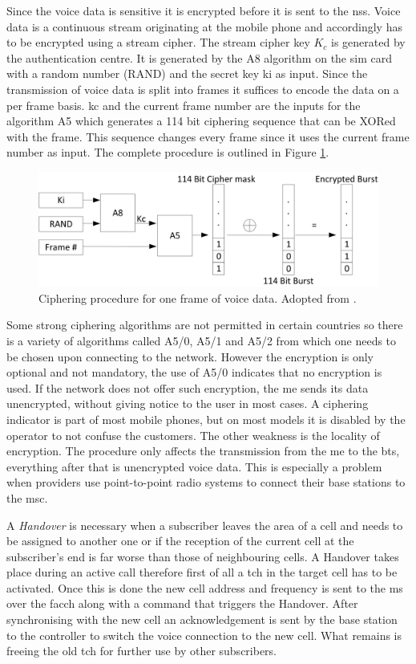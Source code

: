 Since the voice data is sensitive it is encrypted before it is sent to the \gls{nss}.
Voice data is a continuous stream originating at the mobile phone and accordingly has to be encrypted using a stream cipher.
The stream cipher key $K_c$ is generated by the authentication centre.
It is generated by the A8 algorithm on the \gls{sim} card with a random number (RAND) and the secret key \gls{ki} as input.
Since the transmission of voice data is split into frames it suffices to encode the data on a per frame basis.
\gls{kc} and the current frame number are the inputs for the algorithm A5 which generates a 114 bit ciphering sequence that can be XORed with the frame.
This sequence changes every frame since it uses the current frame number as input.
The complete procedure is outlined in Figure \ref{fig:cypher}.
\begin{figure}
\centering
\includegraphics{../Images/Cipher}
\caption{Ciphering procedure for one frame of voice data. Adopted from \cite{kommsys2006}.}
\label{fig:cypher}
\end{figure}
Some strong ciphering algorithms are not permitted in certain countries so there is a variety of algorithms called A5/0, A5/1 and A5/2 from which one needs to be chosen upon connecting to the network.
However the encryption is only optional and not mandatory, the use of A5/0 indicates that no encryption is used.
If the network does not offer such encryption, the \gls{me} sends its data unencrypted, without giving notice to the user in most cases.
A ciphering indicator is part of most mobile phones, but on most models it is disabled by the operator to not confuse the customers.
The other weakness is the locality of encryption.
The procedure only affects the transmission from the \gls{me} to the \gls{bts}, everything after that is unencrypted voice data.
This is especially a problem when providers use point-to-point radio systems to connect their base stations to the \gls{msc}.

A \emph{Handover} is necessary when a subscriber leaves the area of a cell and needs to be assigned to another one or if the reception of the current cell at the subscriber's end is far worse than those of neighbouring cells.
A Handover takes place during an active call therefore first of all a \gls{tch} in the target cell has to be activated.
Once this is done the new cell address and frequency is sent to the \gls{ms} over the \gls{facch} along with a command that triggers the Handover.
After synchronising with the new cell an acknowledgement is sent by the base station to the controller to switch the voice connection to the new cell.
What remains is freeing the old \gls{tch} for further use by other subscribers.

